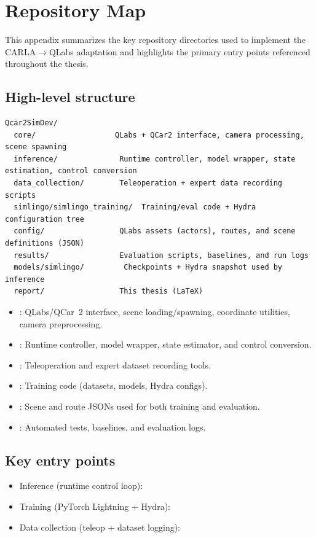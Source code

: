 \chapter{Repository Map}
\label{app:repo-map}

This appendix summarizes the key repository directories used to implement the CARLA\texorpdfstring{$\rightarrow$}{->}QLabs adaptation and highlights the primary entry points referenced throughout the thesis.

\section{High-level structure}
\begingroup
\singlespacing\small
\begin{verbatim}
Qcar2SimDev/
  core/                  QLabs + QCar2 interface, camera processing, scene spawning
  inference/              Runtime controller, model wrapper, state estimation, control conversion
  data_collection/        Teleoperation + expert data recording scripts
  simlingo/simlingo_training/  Training/eval code + Hydra configuration tree
  config/                 QLabs assets (actors), routes, and scene definitions (JSON)
  results/                Evaluation scripts, baselines, and run logs
  models/simlingo/         Checkpoints + Hydra snapshot used by inference
  report/                 This thesis (LaTeX)
\end{verbatim}
\endgroup

\begin{itemize}[leftmargin=*]
  \item {}: QLabs/QCar~2 interface, scene loading/spawning, coordinate utilities, camera preprocessing.
  \item {}: Runtime controller, model wrapper, state estimator, and control conversion.
  \item {}: Teleoperation and expert dataset recording tools.
  \item {}: Training code (datasets, models, Hydra configs).
  \item {}: Scene and route JSONs used for both training and evaluation.
  \item {}: Automated tests, baselines, and evaluation logs.
\end{itemize}

\section{Key entry points}
\begin{itemize}[leftmargin=*]
  \item Inference (runtime control loop): 
  \item Training (PyTorch Lightning + Hydra): 
  \item Data collection (teleop + dataset logging): 
\end{itemize}

